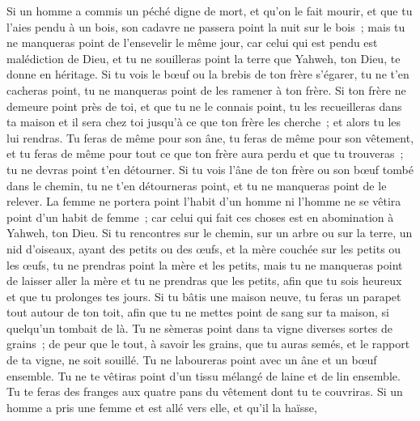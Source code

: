 \begin{multicols}{2}
Si un homme a commis un péché digne de mort, et qu'on le fait mourir, et que tu l'aies pendu à un bois,
son cadavre ne passera point la nuit sur le bois~; mais tu ne manqueras point de l'ensevelir le même jour, car celui qui est pendu est malédiction de Dieu, et tu ne souilleras point la terre que Yahweh, ton Dieu, te donne en héritage.
\VerseOne{}Si tu vois le bœuf ou la brebis de ton frère s'égarer, tu ne t'en cacheras point, tu ne manqueras point de les ramener à ton frère.
Si ton frère ne demeure point près de toi, et que tu ne le connais point, tu les recueilleras dans ta maison et il sera chez toi jusqu'à ce que ton frère les cherche~; et alors tu les lui rendras.
Tu feras de même pour son âne, tu feras de même pour son vêtement, et tu feras de même pour tout ce que ton frère aura perdu et que tu trouveras~; tu ne devras point t'en détourner.
Si tu vois l'âne de ton frère ou son bœuf tombé dans le chemin, tu ne t'en détourneras point, et tu ne manqueras point de le relever.
La femme ne portera point l'habit d'un homme ni l'homme ne se vêtira point d'un habit de femme~; car celui qui fait ces choses est en abomination à Yahweh, ton Dieu.
Si tu rencontres sur le chemin, sur un arbre ou sur la terre, un nid d'oiseaux, ayant des petits ou des œufs, et la mère couchée sur les petits ou les œufs, tu ne prendras point la mère et les petits,
mais tu ne manqueras point de laisser aller la mère et tu ne prendras que les petits, afin que tu sois heureux et que tu prolonges tes jours.
Si tu bâtis une maison neuve, tu feras un parapet tout autour de ton toit, afin que tu ne mettes point de sang sur ta maison, si quelqu'un tombait de là.
Tu ne sèmeras point dans ta vigne diverses sortes de grains~; de peur que le tout, à savoir les grains, que tu auras semés, et le rapport de ta vigne, ne soit souillé.
Tu ne laboureras point avec un âne et un bœuf ensemble.
Tu ne te vêtiras point d'un tissu mélangé de laine et de lin ensemble.
Tu te feras des franges aux quatre pans du vêtement dont tu te couvriras.
Si un homme a pris une femme et est allé vers elle, et qu'il la haïsse,

\end{multicols}
